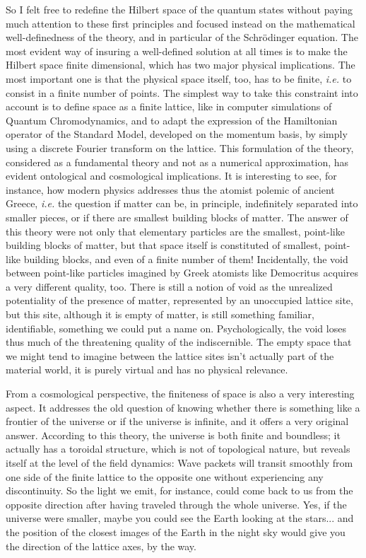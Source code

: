 So I felt free to redefine the Hilbert space of the quantum states without paying much attention to these first principles and focused instead on the mathematical well-definedness of the theory, and in particular of the Schrödinger equation.
The most evident way of insuring a well-defined solution at all times is to make the Hilbert space finite dimensional, which has two major physical implications.
The most important one is that the physical space itself, too, has to be finite, \textit{i.e.} to consist in a finite number of points.
The simplest way to take this constraint into account is to define space as a finite lattice, like in computer simulations of Quantum Chromodynamics, and to adapt the expression of the Hamiltonian operator of the Standard Model, developed on the momentum basis, by simply using a discrete Fourier transform on the lattice.
This formulation of the theory, considered as a fundamental theory and not as a numerical approximation, has evident ontological and cosmological implications.
It is interesting to see, for instance, how modern physics addresses thus the atomist polemic of ancient Greece, \textit{i.e.} the question if matter can be, in principle, indefinitely separated into smaller pieces, or if there are smallest building blocks of matter.
The answer of this theory were not only that elementary particles are the smallest, point-like building blocks of matter, but that space itself is constituted of smallest, point-like building blocks, and even of a finite number of them! Incidentally, the void between point-like particles imagined by Greek atomists like Democritus acquires a very different quality, too.
There is still a notion of void as the unrealized potentiality of the presence of matter, represented by an unoccupied lattice site, but this site, although it is empty of matter, is still something familiar, identifiable, something we could put a name on.
Psychologically, the void loses thus much of the threatening quality of the indiscernible.
The empty space that we might tend to imagine between the lattice sites isn't actually part of the material world, it is purely virtual and has no physical relevance.

From a cosmological perspective, the finiteness of space is also a very interesting aspect.
It addresses the old question of knowing whether there is something like a frontier of the universe or if the universe is infinite, and it offers a very original answer.
According to this theory, the universe is both finite and boundless; it actually has a toroidal structure, which is not of topological nature, but reveals itself at the level of the field dynamics: Wave packets will transit smoothly from one side of the finite lattice to the opposite one without experiencing any discontinuity.
So the light we emit, for instance, could come back to us from the opposite direction after having traveled through the whole universe.
Yes, if the universe were smaller, maybe you could see the Earth looking at the stars...
and the position of the closest images of the Earth in the night sky would give you the direction of the lattice axes, by the way.

